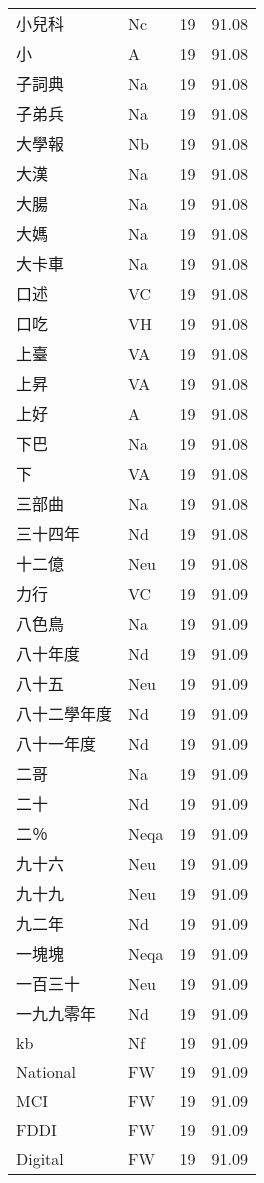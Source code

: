 \documentclass[twocolumn]{book}
\begin{document}
\begin{supertabular}{llrr}
小兒科 & Nc & 19 &  91.08\\
小 & A & 19 &  91.08\\
子詞典 & Na & 19 &  91.08\\
子弟兵 & Na & 19 &  91.08\\
大學報 & Nb & 19 &  91.08\\
大漢 & Na & 19 &  91.08\\
大腸 & Na & 19 &  91.08\\
大媽 & Na & 19 &  91.08\\
大卡車 & Na & 19 &  91.08\\
口述 & VC & 19 &  91.08\\
口吃 & VH & 19 &  91.08\\
上臺 & VA & 19 &  91.08\\
上昇 & VA & 19 &  91.08\\
上好 & A & 19 &  91.08\\
下巴 & Na & 19 &  91.08\\
下 & VA & 19 &  91.08\\
三部曲 & Na & 19 &  91.08\\
三十四年 & Nd & 19 &  91.08\\
十二億 & Neu & 19 &  91.08\\
力行 & VC & 19 &  91.09\\
八色鳥 & Na & 19 &  91.09\\
八十年度 & Nd & 19 &  91.09\\
八十五 & Neu & 19 &  91.09\\
八十二學年度 & Nd & 19 &  91.09\\
八十一年度 & Nd & 19 &  91.09\\
二哥 & Na & 19 &  91.09\\
二十 & Nd & 19 &  91.09\\
二％ & Neqa & 19 &  91.09\\
九十六 & Neu & 19 &  91.09\\
九十九 & Neu & 19 &  91.09\\
九二年 & Nd & 19 &  91.09\\
一塊塊 & Neqa & 19 &  91.09\\
一百三十 & Neu & 19 &  91.09\\
一九九零年 & Nd & 19 &  91.09\\
kb & Nf & 19 &  91.09\\
National & FW & 19 &  91.09\\
MCI & FW & 19 &  91.09\\
FDDI & FW & 19 &  91.09\\
Digital & FW & 19 &  91.09\\

\end{supertabular}
\end{document}
